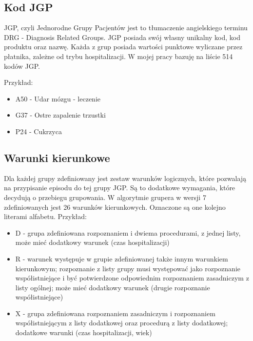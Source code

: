 
\subsection{Kod JGP}
\label{sec:kodJGP}

JGP, czyli Jednorodne Grupy Pacjentów jest to tłumaczenie angielskiego terminu DRG - Diagnosis Related Groups.
JGP posiada swój własny unikalny kod, kod produktu oraz nazwę. Każda z grup posiada wartości punktowe wyliczane przez płatnika, zależne od trybu hospitalizacji. W mojej pracy bazuję na liście 514 kodów JGP.

Przykład:
\begin{itemize}
\item A50 - Udar mózgu - leczenie
\item G37 - Ostre zapalenie trzustki
\item P24 - Cukrzyca
\end{itemize}


\subsection{Warunki kierunkowe}
\label{sec:warunkiKierunkowe}

Dla każdej grupy zdefiniowany jest zestaw warunków logicznych, które pozwalają na przypisanie episodu do tej grupy JGP. Są to dodatkowe wymagania, które decydują o przebiegu grupowania. W algorytmie grupera w wersji 7 zdefiniowanych jest 26 warunków kierunkowych. Oznaczone są one kolejno literami alfabetu.
Przykład:
\begin{itemize}
\item D - grupa zdefiniowana rozpoznaniem i dwiema procedurami, z jednej listy, może mieć dodatkowy warunek (czas hospitalizacji)
\item R - warunek występuje w grupie zdefiniowanej także innym warunkiem kierunkowym; rozpoznanie 
z listy grupy musi występować jako rozpoznanie współistniejące i być potwierdzone odpowiednim rozpoznaniem zasadniczym z listy ogólnej; może mieć dodatkowy warunek (drugie rozpoznanie współistniejące)
\item X - grupa zdefiniowana rozpoznaniem zasadniczym i rozpoznaniem współistniejącym z listy dodatkowej oraz procedurą z listy dodatkowej; dodatkowe warunki (czas hospitalizacji, wiek)
\end{itemize}

